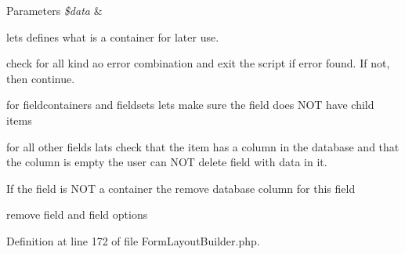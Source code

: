 \begin{DoxyParams}{\-Parameters}
{\em \$data} & \\
\hline
\end{DoxyParams}
lets defines what is a container for later use.

check for all kind ao error combination and exit the script if error found. \-If not, then continue.

for fieldcontainers and fieldsets lets make sure the field does \-N\-O\-T have child items

for all other fields lats check that the item has a column in the database and that the column is empty the user can \-N\-O\-T delete field with data in it.

\-If the field is \-N\-O\-T a container the remove database column for this field

remove field and field options

\-Definition at line 172 of file \-Form\-Layout\-Builder.\-php.


